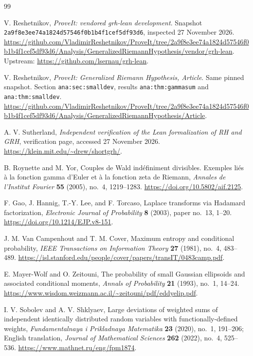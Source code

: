 \clearpage
\begin{thebibliography}{99}
\small
\raggedright
{}

V. Reshetnikov, \emph{ProveIt: vendored grh-lean development}.
Snapshot \texttt{2a9f8e3ee74a1824d57546f0b1b4f1cef5df93d6},
inspected 27 November 2026.
\url{https://github.com/VladimirReshetnikov/ProveIt/tree/2a9f8e3ee74a1824d57546f0b1b4f1cef5df93d6/Analysis/GeneralizedRiemannHypothesis/vendor/grh-lean}.
Upstream: \url{https://github.com/lsernau/grh-lean}.

V. Reshetnikov, \emph{ProveIt: Generalized Riemann Hypothesis,
Article}. Same pinned snapshot.
Section \texttt{ana:sec:smalldev}, results
\texttt{ana:thm:gammasum} and \texttt{ana:thm:smalldev}.
\url{https://github.com/VladimirReshetnikov/ProveIt/tree/2a9f8e3ee74a1824d57546f0b1b4f1cef5df93d6/Analysis/GeneralizedRiemannHypothesis/Article}.

A. V. Sutherland, \emph{Independent verification of the Lean
formalization of RH and GRH}, verification page, accessed
27 November 2026.
\url{https://klein.mit.edu/~drew/shortgrh/}.

B. Roynette and M. Yor, Couples de Wald ind\'efiniment divisibles.
Exemples li\'es \`a la fonction gamma d'Euler et \`a la fonction zeta
de Riemann, \emph{Annales de l'Institut Fourier} \textbf{55} (2005),
no.~4, 1219--1283.
\url{https://doi.org/10.5802/aif.2125}.

F. Gao, J. Hannig, T.-Y. Lee, and F. Torcaso,
Laplace transforms via Hadamard factorization,
\emph{Electronic Journal of Probability} \textbf{8} (2003),
paper no.~13, 1--20.
\url{https://doi.org/10.1214/EJP.v8-151}.

J. M. Van Campenhout and T. M. Cover,
Maximum entropy and conditional probability,
\emph{IEEE Transactions on Information Theory} \textbf{27} (1981),
no.~4, 483--489.
\url{https://isl.stanford.edu/people/cover/papers/transIT/0483camp.pdf}.

E. Mayer-Wolf and O. Zeitouni,
The probability of small Gaussian ellipsoids and associated conditional
moments, \emph{Annals of Probability} \textbf{21} (1993), no.~1, 14--24.
\url{https://www.wisdom.weizmann.ac.il/~zeitouni/pdf/eddyelip.pdf}.

I. V. Sobolev and A. V. Shklyaev,
Large deviations of weighted sums of independent identically distributed
random variables with functionally-defined weights,
\emph{Fundamentalnaya i Prikladnaya Matematika} \textbf{23} (2020),
no.~1, 191--206; English translation,
\emph{Journal of Mathematical Sciences} \textbf{262} (2022),
no.~4, 525--536.
\url{https://www.mathnet.ru/eng/fpm1874}.


\end{thebibliography}
